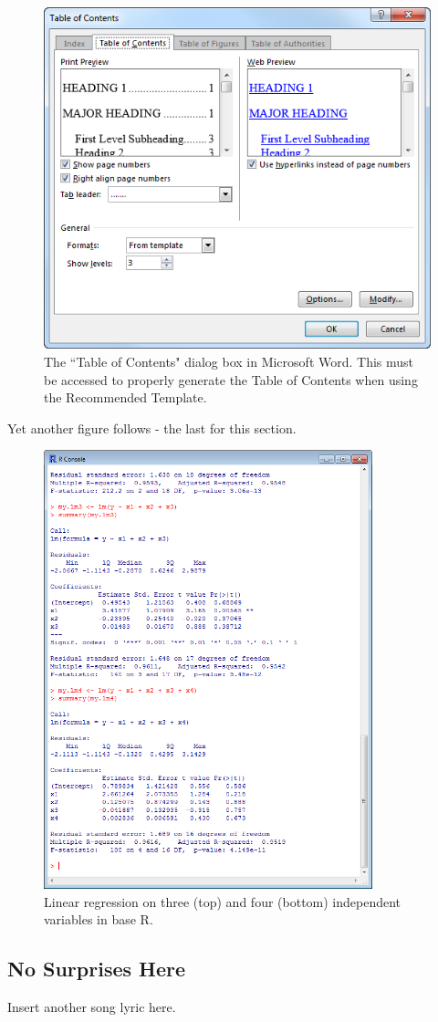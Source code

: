 \begin{figure}[H]
	\centering
	\includegraphics[scale=0.45]{images/TOC2.png}
	\singlespace
	\caption{The ``Table of Contents" dialog box in Microsoft Word. This must be accessed to properly generate the Table of Contents when using the Recommended Template.}
\end{figure}

Yet another figure follows - the last for this section.

\begin{figure}[H]
	\centering
	\includegraphics[width=3.75in]{images/Rachl3.png}
	\singlespace
	\caption{Linear regression on three (top) and four (bottom) independent variables in base R.}
\end{figure}

\subsection{No Surprises Here}
Insert another song lyric here.


